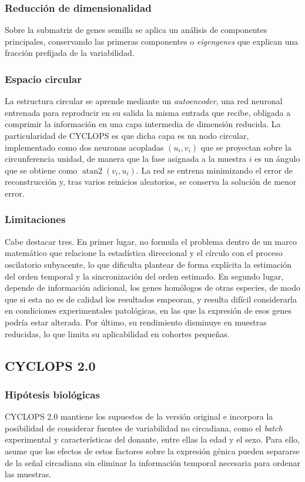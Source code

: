 \documentclass[12pt, a4paper]{report}
\begin{document}
\subsubsection*{Reducción de dimensionalidad}
Sobre la submatriz de genes semilla se aplica un análisis de componentes principales, conservando las primeras componentes o \emph{eigengenes} que explican una fracción prefijada de la variabilidad.

\subsubsection*{Espacio circular}
La estructura circular se aprende mediante un \textit{autoencoder}, una red neuronal entrenada para reproducir en su salida la misma entrada que recibe, obligada a comprimir la información en una capa intermedia de dimensión reducida. La particularidad de CYCLOPS es que dicha capa es un nodo circular, implementado como dos neuronas acopladas \((u_i,v_i)\) que se proyectan sobre la circunferencia unidad, de manera que la fase asignada a la muestra \(i\) es un ángulo que se obtiene como \(\operatorname{atan2}\left(v_i,u_i\right).\)
La red se entrena minimizando el error de reconstrucción y, tras varios reinicios aleatorios, se conserva la solución de menor error.

\subsubsection*{Limitaciones}
Cabe destacar tres. En primer lugar, no formula el problema dentro de un marco matemático que relacione la estadística direccional y el círculo con el proceso oscilatorio subyacente, lo que dificulta plantear de forma explícita la estimación del orden temporal y la sincronización del orden estimado. En segundo lugar, depende de información adicional, los genes homólogos de otras especies, de modo que si esta no es de calidad los resultados empeoran, y resulta difícil considerarla en condiciones experimentales patológicas, en las que la expresión de esos genes podría estar alterada. Por último, su rendimiento disminuye en muestras reducidas, lo que limita su aplicabilidad en cohortes pequeñas.

\subsection{CYCLOPS 2.0}

\subsubsection*{Hipótesis biológicas}
CYCLOPS 2.0 \citep{CYCLOPS2} mantiene los supuestos de la versión original e incorpora la posibilidad de considerar fuentes de variabilidad no circadiana, como el \textit{batch} experimental y características del donante, entre ellas la edad y el sexo. Para ello, asume que los efectos de estos factores sobre la expresión génica pueden separarse de la señal circadiana sin eliminar la información temporal necesaria para ordenar las muestras.
\end{document}
